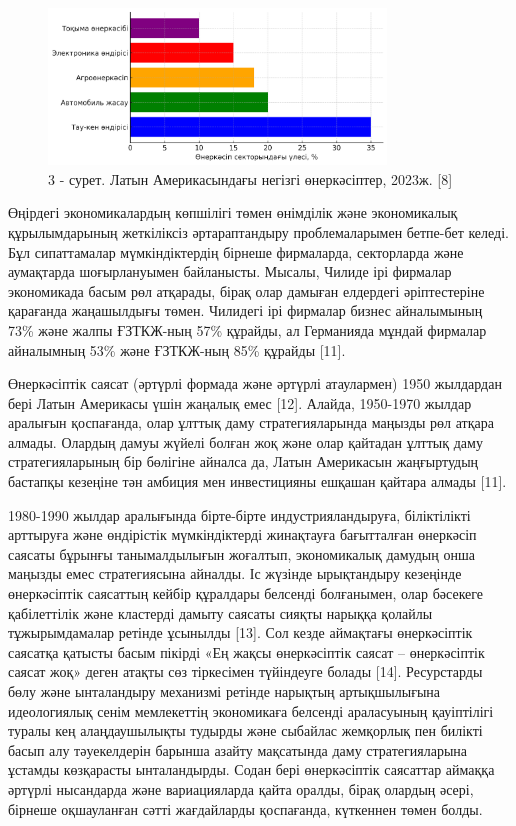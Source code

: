 \begin{figure}[H]
	\centering
	\includegraphics[width=0.8\textwidth]{media/ekon2/image53}
	\caption*{3 - сурет. Латын Америкасындағы негізгі өнеркәсіптер, 2023ж. {[}8{]}}
\end{figure}

\begin{multicols}{2}
Өңірдегі экономикалардың көпшілігі төмен өнімділік және экономикалық
құрылымдарының жеткіліксіз әртараптандыру проблемаларымен бетпе-бет
келеді. Бұл сипаттамалар мүмкіндіктердің бірнеше фирмаларда, секторларда
және аумақтарда шоғырлануымен байланысты. Мысалы, Чилиде ірі фирмалар
экономикада басым рөл атқарады, бірақ олар дамыған елдердегі
әріптестеріне қарағанда жаңашылдығы төмен. Чилидегі ірі фирмалар бизнес
айналымының 73\% және жалпы ҒЗТКЖ-ның 57\% құрайды, ал Германияда мұндай
фирмалар айналымның 53\% және ҒЗТКЖ-ның 85\% құрайды {[}11{]}.

Өнеркәсіптік саясат (әртүрлі формада және әртүрлі атаулармен) 1950
жылдардан бері Латын Америкасы үшін жаңалық емес {[}12{]}. Алайда,
1950-1970 жылдар аралығын қоспағанда, олар ұлттық даму стратегияларында
маңызды рөл атқара алмады. Олардың дамуы жүйелі болған жоқ және олар
қайтадан ұлттық даму стратегияларының бір бөлігіне айналса да, Латын
Америкасын жаңғыртудың бастапқы кезеңіне тән амбиция мен инвестицияны
ешқашан қайтара алмады {[}11{]}.

1980-1990 жылдар аралығында бірте-бірте индустрияландыруға, біліктілікті
арттыруға және өндірістік мүмкіндіктерді жинақтауға бағытталған
өнеркәсіп саясаты бұрынғы танымалдылығын жоғалтып, экономикалық дамудың
онша маңызды емес стратегиясына айналды. Іс жүзінде ырықтандыру
кезеңінде өнеркәсіптік саясаттың кейбір құралдары белсенді болғанымен,
олар бәсекеге қабілеттілік және кластерді дамыту саясаты сияқты нарыққа
қолайлы тұжырымдамалар ретінде ұсынылды {[}13{]}. Сол кезде аймақтағы
өнеркәсіптік саясатқа қатысты басым пікірді «Ең жақсы өнеркәсіптік
саясат -- өнеркәсіптік саясат жоқ» деген атақты сөз тіркесімен
түйіндеуге болады {[}14{]}. Ресурстарды бөлу және ынталандыру механизмі
ретінде нарықтың артықшылығына идеологиялық сенім мемлекеттің
экономикаға белсенді араласуының қауіптілігі туралы кең алаңдаушылықты
тудырды және сыбайлас жемқорлық пен билікті басып алу тәуекелдерін
барынша азайту мақсатында даму стратегияларына ұстамды көзқарасты
ынталандырды. Содан бері өнеркәсіптік саясаттар аймаққа әртүрлі
нысандарда және вариацияларда қайта оралды, бірақ олардың әсері, бірнеше
оқшауланған сәтті жағдайларды қоспағанда, күткеннен төмен болды.


\end{multicols}
